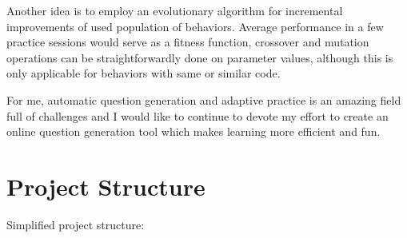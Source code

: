 \documentclass[12pt, twoside]{fithesis2}
\renewcommand{\_}{\leavevmode \kern0.07em\vbox{\hrule width0.4em}}
\begin{document}
Another idea is to employ an evolutionary algorithm for incremental improvements of used population of behaviors.
Average performance in a few practice sessions would serve as a fitness function,
crossover and mutation operations can be straightforwardly done on parameter values,
although this is only applicable for behaviors with same or similar code.

For me, automatic question generation and adaptive practice is an amazing field full of challenges
and I would like to continue to devote my effort to create an online question generation tool which makes learning more efficient and fun.




\appendix


\printbibliography

\chapter{Project Structure}
\label{chap:project-structure}

Simplified project structure:
\end{document}

